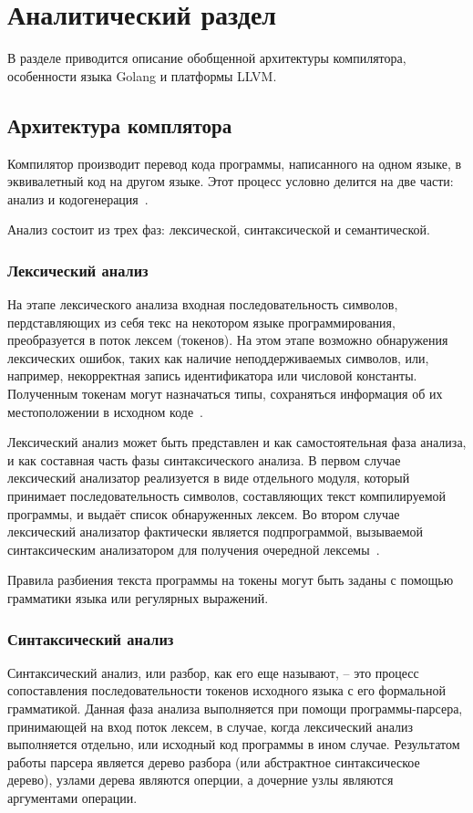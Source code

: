 \section{Аналитический раздел}\label{sec:analytic}
В разделе приводится описание обобщенной архитектуры компилятора, особенности языка Golang и платформы LLVM.

\subsection{Архитектура комплятора}\label{subsec:architecture}
Компилятор производит перевод кода программы, написанного на одном языке, в эквивалетный код на другом языке.
Этот процесс условно делится на две части: анализ и кодогенерация~\cite{aho_compilers}.

Анализ состоит из трех фаз: лексической, синтаксической и семантической.

\subsubsection{Лексический анализ}\label{lexical_analyz}
На этапе лексического анализа входная последовательность символов, пердставляющих из себя текс на некотором языке
программирования, преобразуется в поток лексем (токенов).
На этом этапе возможно обнаружения лексических ошибок, таких как наличие неподдерживаемых символов, или, например,
некорректная запись идентификатора или числовой константы.
Полученным токенам могут назначаться типы, сохраняться информация об их местоположении в исходном коде~\cite{aho_compilers}.

Лексический анализ может быть представлен и как самостоятельная фаза анализа, и как составная часть фазы синтаксического анализа.
В первом случае лексический анализатор реализуется в виде отдельного модуля, который принимает последовательность символов, составляющих
текст компилируемой программы, и выдаёт список обнаруженных лексем.
Во втором случае лексический анализатор фактически является подпрограммой, вызываемой синтаксическим анализатором для получения
очередной лексемы~\cite{based}.

Правила разбиения текста программы на токены могут быть заданы с помощью грамматики языка или регулярных выражений.

\subsubsection{Синтаксический анализ}\label{subsubsec:syntax_analyz}
Синтаксический анализ, или разбор, как его еще называют, – это процесс сопоставления последовательности
токенов исходного языка с его формальной грамматикой. Данная фаза анализа выполняется при помощи программы-парсера,
принимающей на вход поток лексем, в случае, когда лексический анализ выполняется отдельно, или исходный код программы в
ином случае. Результатом работы парсера является дерево разбора (или абстрактное синтаксическое дерево),
узлами дерева являются оперции, а дочерние узлы являются аргументами операции.

